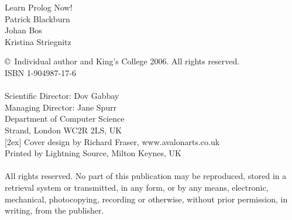 \newpage
\thispagestyle{empty}


\begin{center}
\vspace*{4cm}
{\jlctitleC L\sqz e\sqz a\sqz r\sqz n P\sqz r\sqz o\sqz l\sqz o\sqz g N\sqz o\sqz w\sqz !}\\[16ex]
{\jlctitleB Patrick Blackburn}\\[3ex]
{\jlctitleB Johan Bos}\\[3ex] {\jlctitleB Kristina Striegnitz}
\end{center}


\newpage\thispagestyle{empty}
\mbox{}
\vspace*{3in}

\vfill
\noindent \copyright ~{\sf Individual author and King's College 2006.
All rights reserved.}\\[3ex]
{\sf ISBN 1-904987-17-6}\\
\\
{\sf Scientific Director: Dov Gabbay}\\
{\sf Managing Director: Jane Spurr}\\
{\sf Department of Computer Science}\\
{\sf Strand, London WC2R 2LS, UK}\\
[2ex]
\noindent
{\sf Cover design by Richard Fraser, www.avalonarts.co.uk}\\
{\sf Printed by Lightning Source, Milton Keynes, UK}\\[.5ex]


\noindent \hrulefill\\
\noindent \footnotesize{\sf All rights reserved.  No part of this publication may be reproduced, stored in a retrieval system or transmitted, in any form, or by any means, electronic, mechanical, photocopying, recording or otherwise, without prior permission, in writing, from the publisher.}


